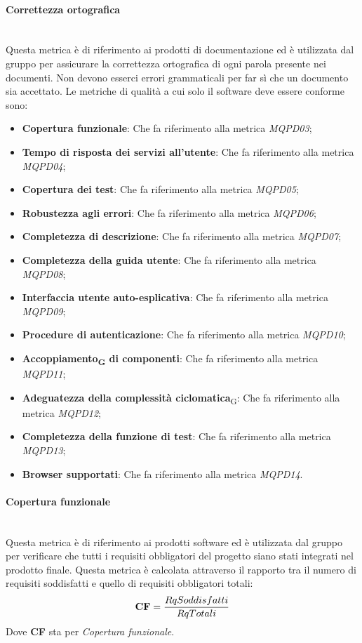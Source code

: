 \paragraph{Correttezza ortografica}\mbox{}\\
Questa metrica è di riferimento ai prodotti di documentazione ed è utilizzata dal gruppo per assicurare la correttezza ortografica di ogni parola presente nei documenti. Non devono esserci errori grammaticali per far sì che un documento sia accettato.
Le metriche di qualità a cui solo il software deve essere conforme sono:
\begin{itemize}
	\item \textbf{Copertura funzionale}: Che fa riferimento alla metrica \textit{MQPD03};
	\item \textbf{Tempo di risposta dei servizi all'utente}: Che fa riferimento alla metrica \textit{MQPD04}; 
	\item \textbf{Copertura dei test}: Che fa riferimento alla metrica \textit{MQPD05}; 
	\item \textbf{Robustezza agli errori}: Che fa riferimento alla metrica \textit{MQPD06};
	\item \textbf{Completezza di descrizione}: Che fa riferimento alla metrica \textit{MQPD07};
	\item \textbf{Completezza della guida utente}: Che fa riferimento alla metrica \textit{MQPD08};
	\item \textbf{Interfaccia utente auto-esplicativa}: Che fa riferimento alla metrica \textit{MQPD09};
	\item \textbf{Procedure di autenticazione}: Che fa riferimento alla metrica \textit{MQPD10};
	\item \textbf{Accoppiamento\textsubscript{G} di componenti}: Che fa riferimento alla metrica \textit{MQPD11};
	\item \textbf{Adeguatezza della complessità ciclomatica}\textsubscript{G}: Che fa riferimento alla metrica \textit{MQPD12};
	\item \textbf{Completezza della funzione di test}: Che fa riferimento alla metrica \textit{MQPD13};
	\item \textbf{Browser supportati}: Che fa riferimento alla metrica \textit{MQPD14}.
\end{itemize}
\paragraph{Copertura funzionale}\mbox{}\\
Questa metrica è di riferimento ai prodotti software ed è utilizzata dal gruppo per verificare che tutti i requisiti obbligatori del progetto siano stati integrati nel prodotto finale. Questa metrica è calcolata attraverso il rapporto tra il numero di requisiti soddisfatti e quello di requisiti obbligatori totali:
\begin{align*}
	\centering
	\textbf{CF} = \frac{RqSoddisfatti}{RqTotali}
\end{align*}
Dove \textbf{CF} sta per \textit{Copertura funzionale}.
